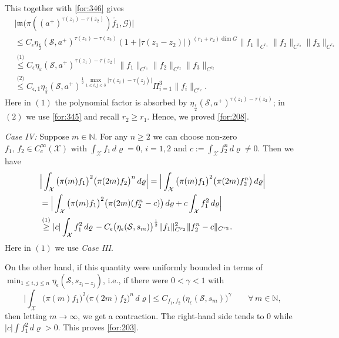 \documentclass[11 pt]{amsart}
\newcommand{\NN}{\mathbb{N}}
\newcommand{\norm}[1]{\lVert#1\rVert}
\newcommand{\abs}[1]{\lvert#1\rvert}
\theoremstyle{definition}
\numberwithin{equation}{section}
\begin{document}
This together with \eqref{for:346} gives
\begin{align*}
 &\big|\mathfrak{m}\big(\pi((a^+)^{\tau(z_1)-\tau(z_2)})\widetilde{f_1},\mathcal{G}\big)\big|\\
 &\leq  C_\epsilon \eta_{\frac{\epsilon}{2}}(\mathcal{S}, a^+)^{\tau(z_1)-\tau(z_2)}(1+|\tau(z_1-z_2)|)^{(r_1+r_2)\dim G}\norm{f_1}_{C^{r_1}}\|f_2\|_{C^{r_2}}\|f_3\|_{C^{r_2}}\\
&\overset{\text{(1)}}{\leq} C_\epsilon \eta_{\varepsilon}(\mathcal{S}, a^+)^{\tau(z_1)-\tau(z_2)}\norm{f_1}_{C^{r_1}}\|f_2\|_{C^{r_2}}\|f_3\|_{C^{r_2}}\\
&\overset{\text{(2)}}{\leq} C_{\epsilon,1}\eta_{\frac{\epsilon}{2}}(\mathcal{S}, a^+)^{\frac{1}{2}\max_{1\leq i,j\leq 3}\abs{\tau(z_i)-\tau(z_j)}}\Pi_{i=1}^3\norm{f_i}_{C^{r_2}}.
\end{align*}
Here in $(1)$ the polynomial factor is absorbed by $\eta_{\frac{\epsilon}{2}}(\mathcal{S}, a^+)^{\tau(z_1)-\tau(z_2)}$; in $(2)$ we use \eqref{for:345} and recall $r_2\geq r_1$.
Hence, we proved \eqref{for:208}.












\smallskip
\emph{Case IV: } Suppose $m\in\NN$. For any $n\geq2$ we can choose non-zero $f_1,\,f_2\in C_c^\infty(\mathcal{X})$ with $\int_{\mathcal{X}} f_1 \, d\varrho=0$, $i=1,2$ and  $c:=\int_{\mathcal{X}} f_2^n \, d\varrho\neq0$.
Then we have
\begin{align*}
 &\Big|\int_{\mathcal{X}} \big(\pi(m)f_1\big)^2 \big(\pi(2m)f_2\big)^n \,d\varrho \Big|=\Big|\int_{\mathcal{X}} \big(\pi(m)f_1\big)^2 \big(\pi(2m)f_2^n\big) \,d\varrho \Big|\notag\\
 &=\Big|\int_{\mathcal{X}} \big(\pi(m)f_1\big)^2 \big(\pi(2m)(f_2^n-c)\big) \,d\varrho +c\int_{\mathcal{X}} f_1^2 \, d\varrho\Big|\notag\\
 &\overset{\text{(1)}}{\geq} |c|\int_{\mathcal{X}} f_1^2 \, d\varrho\,-C_\epsilon \big( \eta_\epsilon(\mathcal{S}, s_{m})\big)^{\frac{1}{2}}\|f_1\|_{C^{r_{2}}}^2\|f_2^n-c\|_{C^{r_{2}}}.
\end{align*}
Here in $(1)$ we use \emph{Case III}.

On the other hand, if this quantity were uniformly bounded in terms of $\min_{1\leq i,j\le n} \eta_\epsilon(\mathcal{S}, s_{z_i-z_j})$, i.e.,  if there were $0<\gamma<1$ with
\[
 \Big|\!\int_{\mathcal{X}} \big(\pi(m)f_1\big)^2 \big(\pi(2m)f_2\big)^n \,d\varrho \Big|
 \le C_{f_1,f_2}\,\big(\eta_\epsilon(\mathcal{S}, s_{m})\big)^\gamma\qquad\forall \,m\in\mathbb N,
\]
then letting $m\to\infty$, we get a contraction.  The right-hand side tends to $0$ while $|c|\int f_1^2\,d\varrho>0$. This proves \eqref{for:203}.
\end{document}
